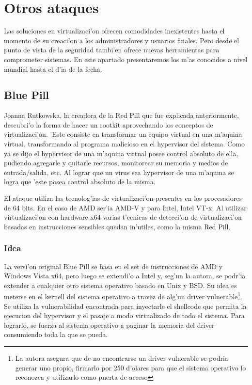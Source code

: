 \section{Otros ataques}

Las soluciones en virtualizaci'on ofrecen comodidades inexistentes hasta el momento de su creaci'on a los administradores y usuarios finales. Pero desde el punto de vista de la seguridad tambi'en ofrece nuevas herramientas para comprometer sistemas. En este apartado presentaremos los m'as conocidos a nivel mundial hasta el d'ia de la fecha. 

\subsection{Blue Pill}

Joanna Rutkowska, la creadora de la Red Pill que fue explicada anteriormente, descubri'o la forma de hacer un rootkit aprovechando los conceptos de virtualizaci'on. 'Este consiste en transformar un equipo virtual en una m'aquina virtual, transformando al programa malicioso en el hypervisor del sistema. Como ya se dijo el hypervisor de una m'aquina virtual posee control absoluto de ella, pudiendo agregarle y quitarle recursos, monitorear su memoria y medios de entrada/salida, etc. Al lograr que un virus sea hypervisor de una m'aquina se logra que 'este posea control absoluto de la misma. 

El ataque utiliza las tecnolog'ias de virtualizaci'on presentes en los procesadores de 64 bits. En el caso de AMD ser'ia AMD-V y para Intel, Intel VT-x. Al utilizar virtualizaci'on con hardware x64 varias t'ecnicas de detecci'on de virtualizaci'on basadas en instrucciones sensibles quedan in'utiles, como la misma Red Pill.


\subsubsection{Idea}

La versi'on original Blue Pill se basa en el set de instrucciones de AMD y Windows Vista x64, pero luego se extendi'o a Intel y, seg'un la autora, se podr'ia extender a cualquier otro sistema operativo basado en Unix y BSD. Su idea es meterse en el kernell del sistema operativo a travez de alg'un driver vulnerable\footnote{La autora asegura que de no encontrarse un driver vulnerable se podria generar uno propio, firmarlo por 250 d'olares para que el sistema operativo lo reconozca y utilizarlo como puerta de acceso}. Se utiliza la vulnerabilidad encontrada para inyectarle el shellcode que permita la ejecucion del hypervisor y el pasaje a modo virtualizado de todo el sistema. Para lograrlo, se fuerza al sistema operativo a paginar la memoria del driver consumiendo toda la que se pueda.

